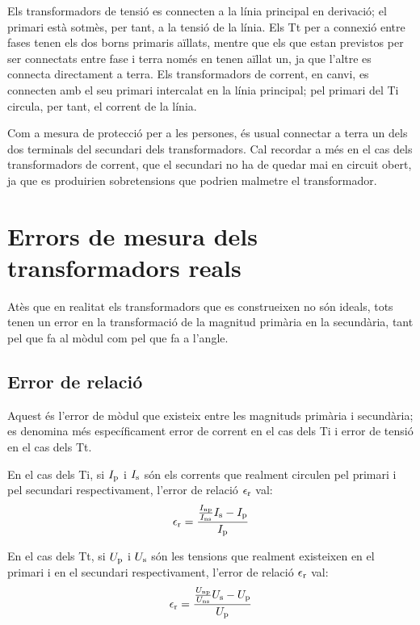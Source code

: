 Els transformadors de tensió es connecten a la línia principal en
derivació; el  primari està sotmès, per tant, a la tensió de la
línia. Els Tt per a connexió entre fases tenen els dos borns
primaris aïllats, mentre que els que estan previstos per ser
connectats entre fase i terra només en tenen aïllat un, ja que
l'altre es connecta directament a terra. Els transformadors de
corrent, en canvi, es connecten amb el seu primari intercalat en la
línia principal;  pel primari del Ti circula, per tant, el corrent
 de la línia.

 Com a mesura de protecció per a les persones, és usual
connectar a terra un dels dos terminals del secundari dels
transformadors. Cal recordar a més en el cas dels transformadors de
corrent, que el secundari no ha de quedar mai en circuit obert, ja
que es produirien sobretensions que podrien malmetre el
transformador.

\section{Errors de mesura dels transformadors reals}

Atès que en realitat els transformadors que es construeixen no són
ideals, tots tenen un error en la transformació de la magnitud
primària en la secundària, tant pel que fa al mòdul com pel que fa
a l'angle.

\subsection{Error de relació}

Aquest és l'error de mòdul que existeix entre les magnituds primària i
secundària; es denomina més específicament error de corrent en el
cas dels Ti i error de tensió en el cas dels Tt.

En el cas dels Ti, si $I_\mathrm{p}$ i $I_\mathrm{s}$ són els corrents que
realment circulen pel primari i pel secundari respectivament,
l'error de relació $\epsilon_\mathrm{r}$ val:
\begin{equation}
    \epsilon_\mathrm{r} = \frac{\frac{I_\mathrm{np}}{I_\mathrm{ns}} I_\mathrm{s} - I_\mathrm{p}} {I_\mathrm{p}}
\end{equation}

En el cas dels Tt, si $U_\mathrm{p}$ i $U_\mathrm{s}$ són les tensions que
realment existeixen en el primari i en el secundari respectivament,
l'error de relació $\epsilon_\mathrm{r}$ val:
\begin{equation}
    \epsilon_\mathrm{r} = \frac{\frac{U_\mathrm{np}}{U_\mathrm{ns}} U_\mathrm{s} - U_\mathrm{p}} {U_\mathrm{p}}
\end{equation}

